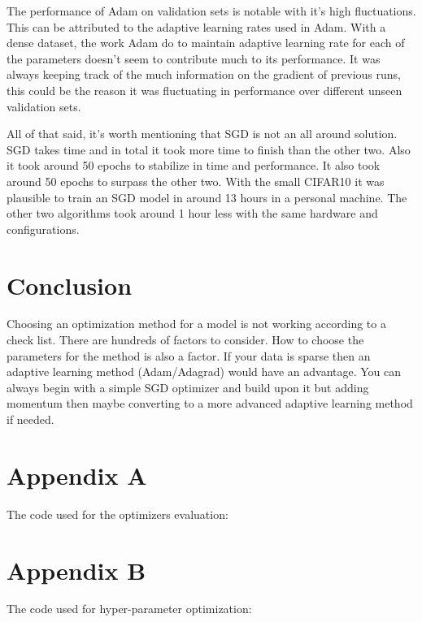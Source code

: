 \documentclass[12pt,twoside]{article}
\theoremstyle{plain}
\theoremstyle{definition}
\theoremstyle{remark}
\begin{document}
The performance of Adam on validation sets is notable with it's high fluctuations. This can be attributed to the adaptive learning rates used in Adam. With a dense dataset, the work Adam do to maintain adaptive learning rate for each of the parameters doesn't seem to contribute much to its performance. It was always keeping track of the much information on the gradient of previous runs, this could be the reason it was fluctuating in performance over different unseen validation sets. 

All of that said, it's worth mentioning that SGD is not an all around solution. SGD takes time and in total it took more time to finish than the other two. Also it took around 50 epochs to stabilize in time and performance. It also took around 50 epochs to surpass the other two. With the small CIFAR10 it was plausible to train an SGD model in around 13 hours in a personal machine. The other two algorithms took around 1 hour less with the same hardware and configurations.

\section{Conclusion}
\label{sec:concl}
Choosing an optimization method for a model is not working according to a check list. There are hundreds of factors to consider. How to choose the parameters for the method is also a factor. If your data is sparse then an adaptive learning method (Adam/Adagrad)  would have an advantage. You can always begin with a simple SGD optimizer and build upon it but adding momentum then maybe converting to a more advanced adaptive learning method if needed.

%
%



\newpage

\begin{appendices}
\section{Appendix A}
The code used for the optimizers  evaluation:


\section{Appendix B}
The code used for hyper-parameter optimization:

\end{appendices}
\end{document}
